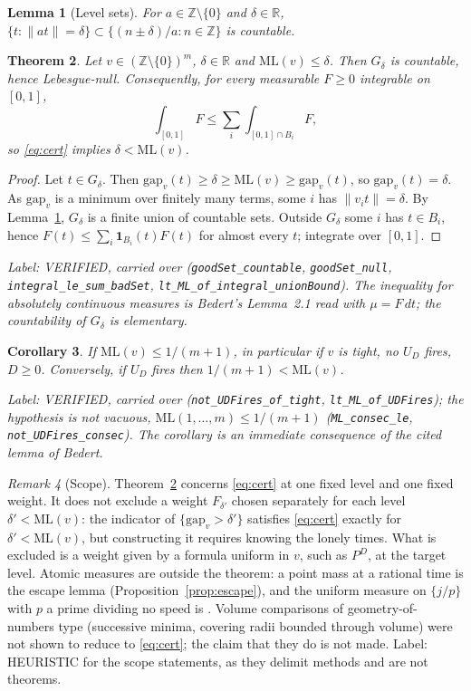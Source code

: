 \documentclass[11pt]{article}
\newtheorem{theorem}{Theorem}
\newtheorem{corollary}[theorem]{Corollary}
\newtheorem{lemma}[theorem]{Lemma}
\theoremstyle{remark}
\newtheorem{remark}[theorem]{Remark}
\newcommand{\norm}[1]{\lVert #1\rVert}
\newcommand{\ML}{\mathrm{ML}}
\newcommand{\gap}{\mathrm{gap}}
\newcommand{\Z}{\mathbb{Z}}
\newcommand{\R}{\mathbb{R}}
\newcommand{\lab}[1]{\par\smallskip\noindent\textit{Label: #1.}}
\begin{document}
\begin{lemma}[Level sets]\label{lem:level}
For $a\in\Z\setminus\{0\}$ and $\delta\in\R$, $\{t:\norm{at}=\delta\}\subset\{(n\pm\delta)/a:n\in\Z\}$ is countable.
\end{lemma}

\begin{theorem}\label{thm:barrier}
Let $v\in(\Z\setminus\{0\})^m$, $\delta\in\R$ and $\ML(v)\le\delta$. Then $G_\delta$ is countable, hence Lebesgue-null. Consequently, for every measurable $F\ge0$ integrable on $[0,1]$,
\[\int_{[0,1]}F\le\sum_i\int_{[0,1]\cap B_i}F,\]
so \eqref{eq:cert} implies $\delta<\ML(v)$.
\end{theorem}
\begin{proof}
Let $t\in G_\delta$. Then $\gap_v(t)\ge\delta\ge\ML(v)\ge\gap_v(t)$, so $\gap_v(t)=\delta$. As $\gap_v$ is a minimum over finitely many terms, some $i$ has $\norm{v_it}=\delta$. By Lemma~\ref{lem:level}, $G_\delta$ is a finite union of countable sets. Outside $G_\delta$ some $i$ has $t\in B_i$, hence $F(t)\le\sum_i\mathbf 1_{B_i}(t)F(t)$ for almost every $t$; integrate over $[0,1]$.
\end{proof}
\lab{VERIFIED, carried over (\texttt{goodSet\_countable}, \texttt{goodSet\_null}, \texttt{integral\_le\_sum\_badSet}, \texttt{lt\_ML\_of\_integral\_unionBound}). The inequality for absolutely continuous measures is Bedert's Lemma~2.1 read with $\mu=F\,dt$; the countability of $G_\delta$ is elementary}

\begin{corollary}\label{cor:tight}
If $\ML(v)\le1/(m+1)$, in particular if $v$ is tight, no $U_D$ fires, $D\ge0$. Conversely, if $U_D$ fires then $1/(m+1)<\ML(v)$.
\end{corollary}
\lab{VERIFIED, carried over (\texttt{not\_UDFires\_of\_tight}, \texttt{lt\_ML\_of\_UDFires}); the hypothesis is not vacuous, $\ML(1,\dots,m)\le1/(m+1)$ (\texttt{ML\_consec\_le}, \texttt{not\_UDFires\_consec}). The corollary is an immediate consequence of the cited lemma of Bedert}

\begin{remark}[Scope]\label{rem:scope}
Theorem~\ref{thm:barrier} concerns \eqref{eq:cert} at one fixed level and one fixed weight. It does not exclude a weight $F_{\delta'}$ chosen separately for each level $\delta'<\ML(v)$: the indicator of $\{\gap_v>\delta'\}$ satisfies \eqref{eq:cert} exactly for $\delta'<\ML(v)$, but constructing it requires knowing the lonely times. What is excluded is a weight given by a formula uniform in $v$, such as $P^D$, at the target level. Atomic measures are outside the theorem: a point mass at a rational time is the escape lemma (Proposition~\ref{prop:escape}), and the uniform measure on $\{j/p\}$ with $p$ a prime dividing no speed is \cite[Lemma~5.3, Cor.~5.4]{Bedert25}. Volume comparisons of geometry-of-numbers type (successive minima, covering radii bounded through volume) were not shown to reduce to \eqref{eq:cert}; the claim that they do is not made. Label: HEURISTIC for the scope statements, as they delimit methods and are not theorems.
\end{remark}
\end{document}
